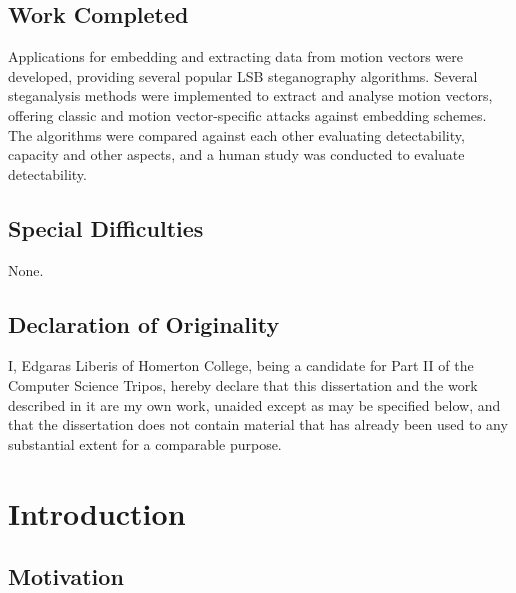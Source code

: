 \documentclass[12pt,british,twoside,notitlepage,usenames,dvipsnames,hypens,final]{report}
\renewcommand\thesubsection{\arabic{subsection}.}
\numberwithin{equation}{section}
\numberwithin{figure}{section}
\begin{document}
\section*{Work Completed}

Applications for embedding and extracting data from motion vectors were developed, providing several popular LSB steganography algorithms. Several steganalysis methods were implemented to extract and analyse motion vectors, offering classic and motion vector-specific attacks against embedding schemes. The algorithms were compared against each other evaluating detectability, capacity and other aspects, and a human study was conducted to evaluate detectability.

\section*{Special Difficulties}

None.

\cleardoublepage

\section*{Declaration of Originality}
I, Edgaras Liberis of Homerton College, being a candidate for Part II of the Computer Science Tripos, hereby declare that this dissertation and the work described in it are my own work, unaided except as may be specified below, and that the dissertation does not contain material that has already been used to any substantial extent for a comparable purpose.

\bigskip
{}

\medskip
{}

\cleardoublepage
\tableofcontents
\renewcommand{\thesection}{\arabic{chapter}.\arabic{section}}
\renewcommand{\thesubsection}{\arabic{chapter}.\arabic{section}.\arabic{subsection}}
\setcounter{chapter}{0}

\cleardoublepage
\chapter{Introduction}
\pagestyle{headings}

\section{Motivation}
\label{motivation}
\end{document}
